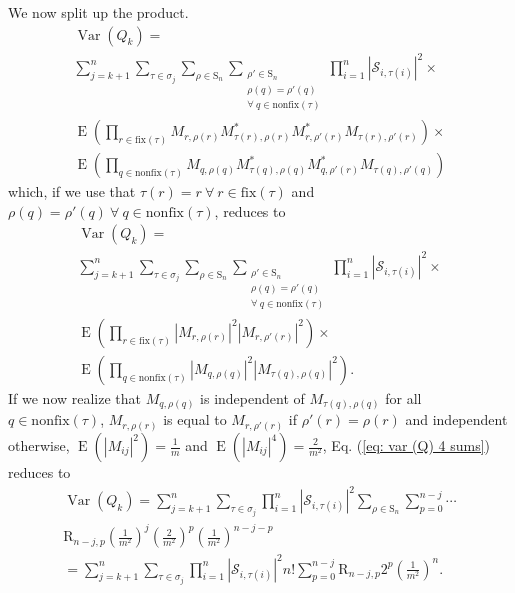 \documentclass[10pt,aps,pra,twocolumn,superscriptaddress]{revtex4-2}
\DeclareMathOperator{\E}{E}
\DeclareMathOperator{\Var}{Var}
\begin{document}
We now split up the product.
\begin{multline}
    \Var(Q_k)=\\
    \sum_{j=k+1}^n\sum_{\tau \in \sigma_j} \sum_{\rho\in\mathrm{S}_n}\sum_{\substack{\rho'\in\mathrm{S}_n\\\rho(q)=\rho'(q)\:\\ \forall\:q\in \mathrm{nonfix}(\tau)}}\prod^n_{i=1}|\mathcal{S}_{i,\tau(i)}|^2\times\\
    \E\left(\prod_{r\in\mathrm{fix}(\tau)}M_{r,\rho(r)} M_{\tau(r),\rho(r)}^*M^{*}_{r,\rho'(r)} M_{\tau(r),\rho'(r)}\right)\times\\\E\left(\prod_{q\in\mathrm{nonfix}(\tau)}M_{q,\rho(q)} M_{\tau(q),\rho(q)}^*M^{*}_{q,\rho'(r)} M_{\tau(q),\rho'(q)}\right)
\end{multline}
which, if we use that $\tau(r)=r\: \forall\:r\in \mathrm{fix}(\tau)$ and $\rho(q)=\rho'(q)\: \forall\:q\in \mathrm{nonfix}(\tau)$, reduces to
\begin{multline}
    \Var(Q_k)=\\
    \sum_{j=k+1}^n\sum_{\tau \in \sigma_j} \sum_{\rho\in\mathrm{S}_n}\sum_{\substack{\rho'\in\mathrm{S}_n\\\rho(q)=\rho'(q)\: \\\forall\:q\in \mathrm{nonfix}(\tau)}}\prod^n_{i=1}|\mathcal{S}_{i,\tau(i)}|^2\times\\
    \E\left(\prod_{r\in\mathrm{fix}(\tau)}|M_{r,\rho(r)}|^2 |M_{r,\rho'(r)}|^2 \right)\times\\\E\left(\prod_{q\in\mathrm{nonfix}(\tau)}|M_{q,\rho(q)}|^2 |M_{\tau(q),\rho(q)}|^2\right).
    \label{eq: var (Q) 4 sums}
\end{multline}
If we now realize that $M_{q,\rho(q)}$ is independent of $M_{\tau(q),\rho(q)}$ for all $q\in \mathrm{nonfix}(\tau)$, $M_{r,\rho(r)}$ is equal to $M_{r,\rho'(r)}$ if $\rho'(r)=\rho(r)$ and independent otherwise, $\E\left(|M_{ij}|^2\right)=\frac{1}{m}$ and $\E\left(|M_{ij}|^4\right)=\frac{2}{m^2}$, Eq. (\ref{eq: var (Q) 4 sums}) reduces to
\begin{multline}
    \Var(Q_k)=
    \sum_{j=k+1}^n \sum_{\tau\in\sigma_j}\prod^n_{i=1}|\mathcal{S}_{i,\tau(i)}|^2\sum_{\rho\in\mathrm{S}_n}\sum^{n-j}_{p=0}\cdots \\\mathrm{R}_{n-j,p}\left(\frac{1}{m^2}\right)^j\left(\frac{2}{m^2}\right)^p\left(\frac{1}{m^2}\right)^{n-j-p}\\
    =\sum_{j=k+1}^n \sum_{\tau\in\sigma_j}\prod^n_{i=1}|\mathcal{S}_{i,\tau(i)}|^2 n!\sum^{n-j}_{p=0}\mathrm{R}_{n-j,p}2^p\left(\frac{1}{m^2}\right)^{n}.
    \label{eq: var (Q) intermediata}
\end{multline}
\end{document}
